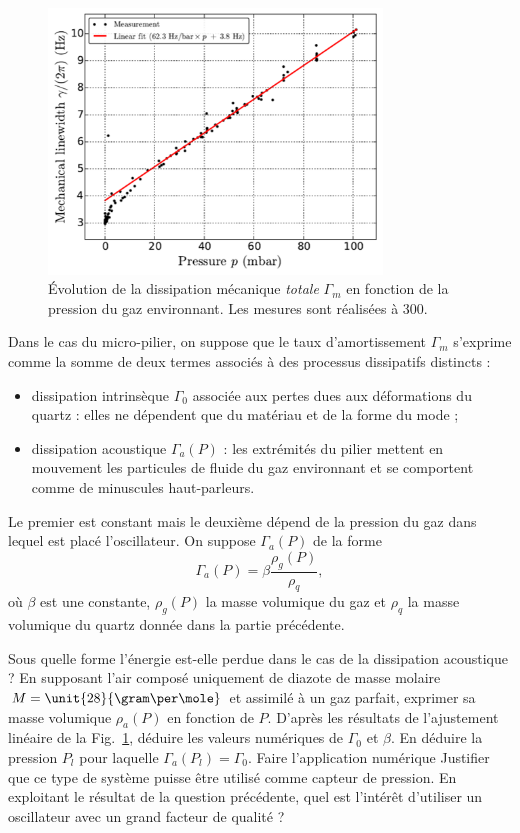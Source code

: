 \documentclass[12pt,a4paper]{exam}
\begin{document}
\begin{figure}
\center
\includegraphics[height=200pt]{gaz_damping.png}
\caption{Évolution de la dissipation mécanique \emph{totale} $\Gamma_m$ en fonction de la pression du gaz environnant.
Les mesures sont réalisées à \unit{300}{\kelvin}.}
\label{fig:gaz_damping}
\end{figure}

Dans le cas du micro-pilier, on suppose que le taux d'amortissement $\Gamma_m$ s'exprime comme la somme de deux termes associés à des processus dissipatifs distincts :
\begin{itemize}
\item dissipation intrinsèque $\Gamma_0$ associée aux pertes dues aux déformations du quartz : elles ne dépendent que du matériau et de la forme du mode ;
\item dissipation acoustique $\Gamma_a(P)$ : les extrémités du pilier mettent en mouvement les particules de fluide du gaz environnant et se comportent comme de minuscules haut-parleurs. 
\end{itemize}
Le premier est constant mais le deuxième dépend de la pression du gaz dans lequel est placé l'oscillateur.
On suppose $\Gamma_a(P)$ de la forme
\begin{equation}
\Gamma_a(P) = \beta \frac{\rho_g(P)}{\rho_q},
\end{equation}
où $\beta$ est une constante, $\rho_g(P)$ la masse volumique du gaz et $\rho_q$ la masse volumique du quartz donnée dans la partie précédente.

\begin{questions}
\question Sous quelle forme l'énergie est-elle perdue dans le cas de la dissipation acoustique ?
\question En supposant l'air composé uniquement de diazote de masse molaire $M=\unit{28}{\gram\per\mole}$ et assimilé à un gaz parfait, exprimer sa masse volumique $\rho_a(P)$ en fonction de $P$.
\question D'après les résultats de l'ajustement linéaire de la Fig.~\ref{fig:gaz_damping}, déduire les valeurs numériques de $\Gamma_0$ et $\beta$.
\question En déduire la pression $P_l$ pour laquelle $\Gamma_a(P_l)=\Gamma_0$.
Faire l'application numérique
\question Justifier que ce type de système puisse être utilisé comme capteur de pression.
En exploitant le résultat de la question précédente, quel est l'intérêt d'utiliser un oscillateur avec un grand facteur de qualité ?
\end{questions}
\end{document}

